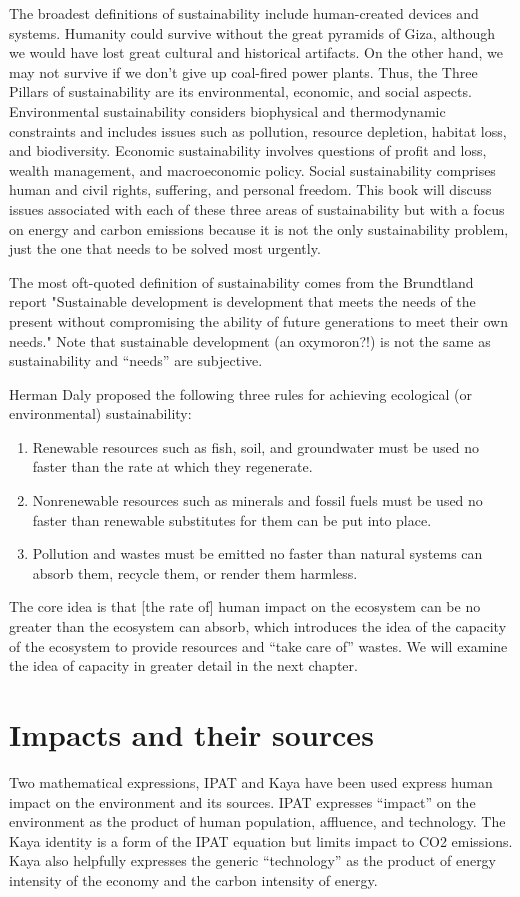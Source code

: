\documentclass{book}\usepackage[]{graphicx}\usepackage[]{color}
\begin{document}
The broadest definitions of sustainability include human-created devices and systems. Humanity could survive without the great pyramids of Giza, although we would have lost great cultural and historical artifacts. On the other hand, we may not survive if we don’t give up coal-fired power plants. Thus, the Three Pillars of sustainability are its environmental, economic, and social aspects. 
Environmental sustainability considers biophysical and thermodynamic constraints and includes issues such as pollution, resource depletion, habitat loss, and biodiversity. Economic sustainability involves questions of profit and loss, wealth management, and macroeconomic policy. Social sustainability comprises human and civil rights, suffering, and personal freedom. This book will discuss issues associated with each of these three areas of sustainability but with a focus on energy and carbon emissions because it is not the only sustainability problem, just the one that needs to be solved most urgently.

The most oft-quoted definition of sustainability comes from the Brundtland report "Sustainable development is development that meets the needs of the present without compromising the ability of future generations to meet their own needs." Note that sustainable development (an oxymoron?!) is not the same as sustainability and “needs” are subjective.

Herman Daly proposed the following three rules for achieving ecological (or environmental) sustainability:
\begin{enumerate}
\item Renewable resources such as fish, soil, and groundwater must be used no faster than the rate at which they regenerate.
\item Nonrenewable resources such as minerals and fossil fuels must be used no faster than renewable substitutes for them can be put into place.
\item Pollution and wastes must be emitted no faster than natural systems can absorb them, recycle them, or render them harmless.
\end{enumerate}

The core idea is that [the rate of] human impact on the ecosystem can be no greater than the ecosystem can absorb, which introduces the idea of the capacity of the ecosystem to provide resources and “take care of” wastes. We will examine the idea of capacity in greater detail in the next chapter.

\section{Impacts and their sources}
Two mathematical expressions, IPAT and Kaya have been used express human impact on the environment and its sources. IPAT expresses “impact” on the environment as the product of human population, affluence, and technology. The Kaya identity is a form of the IPAT equation but limits impact to CO2 emissions. Kaya also helpfully expresses the generic “technology” as the product of energy intensity of the economy and the carbon intensity of energy. 
\end{document}
